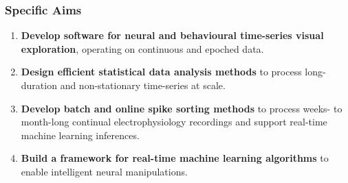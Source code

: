 \documentclass{beamer}
\begin{document}
\begin{frame}
    \frametitle{Specific Aims}

    \begin{enumerate}

        \item \textbf{Develop software for neural and behavioural time-series
            visual exploration}, operating on continuous and epoched data.

        \item \textbf{Design efficient statistical data analysis methods} to
            process long-duration and non-stationary time-series at scale.

        \item \textbf{Develop batch and online spike sorting methods} to
            process weeks- to month-long continual electrophysiology recordings
            and support real-time machine learning inferences.

        \item \textbf{Build a framework for real-time machine learning algorithms} to
            enable intelligent neural manipulations.

    \end{enumerate}

\end{frame}
\end{document}
